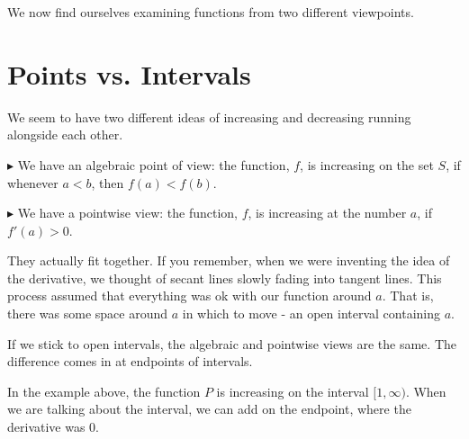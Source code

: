 \documentclass{ximera}
\begin{document}
We now find ourselves examining functions from two different viewpoints. 



\section*{ Points vs. Intervals}




We seem to have two different ideas of increasing and decreasing running alongside each other. 



\textbf{\textcolor{red!70!darkgray}{$\blacktriangleright$}} We have an algebraic point of view: the function, $f$, is increasing on the set $S$, if whenever $a < b$, then $f(a) < f(b)$.



\textbf{\textcolor{red!70!darkgray}{$\blacktriangleright$}} We have a pointwise view: the function, $f$, is increasing at the number $a$, if $f'(a) > 0$. 



They actually fit together. If you remember, when we were inventing the idea of the derivative, we thought of secant lines slowly fading into tangent lines.  This process assumed that everything was ok with our function around $a$.  That is, there was some space around $a$ in which to move - an open interval containing $a$.

If we stick to open intervals, the algebraic and pointwise views are the same.  The difference comes in at endpoints of intervals. 


In the example above, the function $P$ is increasing on the interval $[1, \infty)$.  When we are talking about the interval, we can add on the endpoint, where the derivative was $0$.
\end{document}
